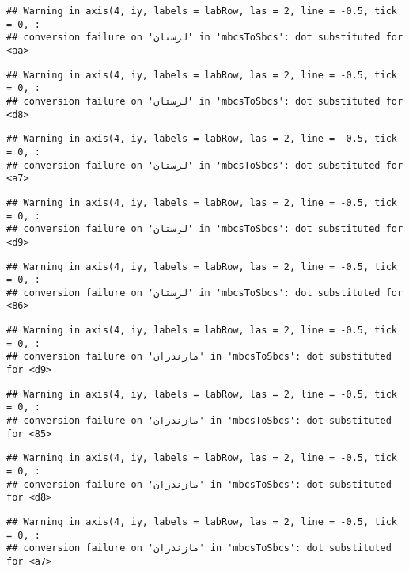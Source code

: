\documentclass[
]{article}
\begin{document}
\begin{verbatim}
## Warning in axis(4, iy, labels = labRow, las = 2, line = -0.5, tick = 0, :
## conversion failure on 'لرستان' in 'mbcsToSbcs': dot substituted for <aa>
\end{verbatim}

\begin{verbatim}
## Warning in axis(4, iy, labels = labRow, las = 2, line = -0.5, tick = 0, :
## conversion failure on 'لرستان' in 'mbcsToSbcs': dot substituted for <d8>
\end{verbatim}

\begin{verbatim}
## Warning in axis(4, iy, labels = labRow, las = 2, line = -0.5, tick = 0, :
## conversion failure on 'لرستان' in 'mbcsToSbcs': dot substituted for <a7>
\end{verbatim}

\begin{verbatim}
## Warning in axis(4, iy, labels = labRow, las = 2, line = -0.5, tick = 0, :
## conversion failure on 'لرستان' in 'mbcsToSbcs': dot substituted for <d9>
\end{verbatim}

\begin{verbatim}
## Warning in axis(4, iy, labels = labRow, las = 2, line = -0.5, tick = 0, :
## conversion failure on 'لرستان' in 'mbcsToSbcs': dot substituted for <86>
\end{verbatim}

\begin{verbatim}
## Warning in axis(4, iy, labels = labRow, las = 2, line = -0.5, tick = 0, :
## conversion failure on 'مازندران' in 'mbcsToSbcs': dot substituted for <d9>
\end{verbatim}

\begin{verbatim}
## Warning in axis(4, iy, labels = labRow, las = 2, line = -0.5, tick = 0, :
## conversion failure on 'مازندران' in 'mbcsToSbcs': dot substituted for <85>
\end{verbatim}

\begin{verbatim}
## Warning in axis(4, iy, labels = labRow, las = 2, line = -0.5, tick = 0, :
## conversion failure on 'مازندران' in 'mbcsToSbcs': dot substituted for <d8>
\end{verbatim}

\begin{verbatim}
## Warning in axis(4, iy, labels = labRow, las = 2, line = -0.5, tick = 0, :
## conversion failure on 'مازندران' in 'mbcsToSbcs': dot substituted for <a7>
\end{verbatim}
\end{document}
